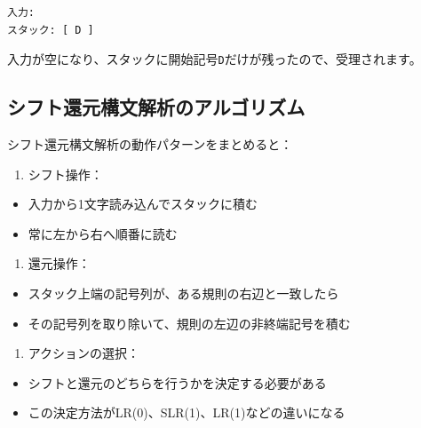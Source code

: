 \begin{verbatim}
入力:
スタック: [ D ]
\end{verbatim}

入力が空になり、スタックに開始記号\texttt{D}だけが残ったので、受理されます。

\hypertarget{chapter5-ux30b7ux30d5ux30c8ux9084ux5143ux69cbux6587ux89e3ux6790ux306eux30a2ux30ebux30b4ux30eaux30baux30e0}{%
\subsection{シフト還元構文解析のアルゴリズム}\label{chapter5-ux30b7ux30d5ux30c8ux9084ux5143ux69cbux6587ux89e3ux6790ux306eux30a2ux30ebux30b4ux30eaux30baux30e0}}

シフト還元構文解析の動作パターンをまとめると：

\begin{enumerate}
\def\labelenumi{\arabic{enumi}.}
\tightlist
\item
  シフト操作：
\end{enumerate}

\begin{itemize}
\tightlist
\item
  入力から1文字読み込んでスタックに積む
\item
  常に左から右へ順番に読む
\end{itemize}

\begin{enumerate}
\def\labelenumi{\arabic{enumi}.}
\setcounter{enumi}{1}
\tightlist
\item
  還元操作：
\end{enumerate}

\begin{itemize}
\tightlist
\item
  スタック上端の記号列が、ある規則の右辺と一致したら
\item
  その記号列を取り除いて、規則の左辺の非終端記号を積む
\end{itemize}

\begin{enumerate}
\def\labelenumi{\arabic{enumi}.}
\setcounter{enumi}{2}
\tightlist
\item
  アクションの選択：
\end{enumerate}

\begin{itemize}
\tightlist
\item
  シフトと還元のどちらを行うかを決定する必要がある
\item
  この決定方法がLR(0)、SLR(1)、LR(1)などの違いになる
\end{itemize}

